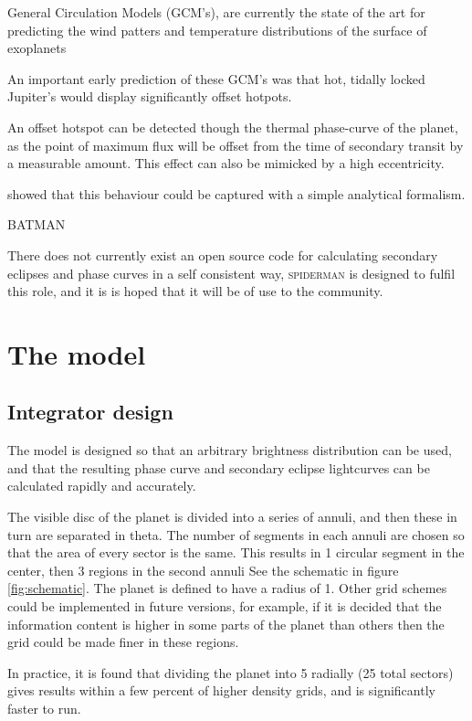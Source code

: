 \documentclass[a4paper,fleqn,usenatbib]{mnras}
\begin{document}
General Circulation Models (GCM's), are currently the state of the art for predicting the wind patters and temperature distributions of the surface of exoplanets \citep[e.g.][]{Showman2008}

An important early prediction of these GCM's was that hot, tidally locked Jupiter's would display significantly offset hotpots.

An offset hotspot can be detected though the thermal phase-curve of the planet, as the point of maximum flux will be offset from the time of secondary transit by a measurable amount. This effect can also be mimicked by a high eccentricity. 

\citet{Zhang2016} showed that this behaviour could be captured with a simple analytical formalism.

BATMAN \citep{Kreidberg2015a}

There does not currently exist an open source code for calculating secondary eclipses and phase curves in a self consistent way, \textsc{spiderman} is designed to fulfil this role, and it is is hoped that it will be of use to the community.

\section{The model}\label{sec:the model}

\subsection{Integrator design}\label{sec:integrator}

The model is designed so that an arbitrary brightness distribution can be used, and that the resulting phase curve and secondary eclipse lightcurves can be calculated rapidly and accurately. 

The visible disc of the planet is divided into a series of annuli, and then these in turn are separated in theta. The number of segments in each annuli are chosen so that the area of every sector is the same. This results in 1 circular segment in the center, then 3 regions in the second annuli See the schematic in figure \ref{fig:schematic}. The planet is defined to have a radius of 1. Other grid schemes could be implemented in future versions, for example, if it is decided that the information content is higher in some parts of the planet than others then the grid could be made finer in these regions.


In practice, it is found that dividing the planet into 5 radially (25 total sectors) gives results within a few percent of higher density grids, and is significantly faster to run.
\end{document}

